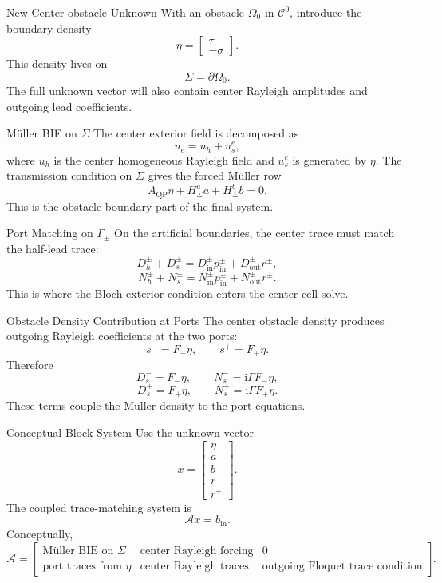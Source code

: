 \documentclass[aspectratio=169]{beamer}
\newcommand{\ii}{\mathrm{i}}
\newcommand{\Ccell}{\mathcal C}
\newcommand{\Atr}{\mathcal A}
\begin{document}
\begin{frame}{New Center-obstacle Unknown}
  With an obstacle \(\Omega_0\) in \(\Ccell^0\), introduce the boundary density
  \[
    \eta=
    \begin{bmatrix}
      \tau\\-\sigma
    \end{bmatrix}.
  \]
  This density lives on
  \[
    \Sigma=\partial\Omega_0.
  \]
  The full unknown vector will also contain center Rayleigh amplitudes and outgoing lead coefficients.
\end{frame}

\begin{frame}{M\"uller BIE on \(\Sigma\)}
  The center exterior field is decomposed as
  \[
    u_e=u_h+u_s^e,
  \]
  where \(u_h\) is the center homogeneous Rayleigh field and \(u_s^e\) is generated by \(\eta\).
  The transmission condition on \(\Sigma\) gives the forced M\"uller row
  \[
    A_{\mathrm{QP}}\eta
    +
    H_\Sigma^a a
    +
    H_\Sigma^b b
    =
    0.
  \]
  This is the obstacle-boundary part of the final system.
\end{frame}

\begin{frame}{Port Matching on \(\Gamma_\pm\)}
  On the artificial boundaries, the center trace must match the half-lead trace:
  \[
    D_h^\pm+D_s^\pm
    =
    D_{\mathrm{in}}^\pm p_{\mathrm{in}}^\pm
    +
    D_{\mathrm{out}}^\pm r^\pm,
  \]
  \[
    N_h^\pm+N_s^\pm
    =
    N_{\mathrm{in}}^\pm p_{\mathrm{in}}^\pm
    +
    N_{\mathrm{out}}^\pm r^\pm.
  \]
  This is where the Bloch exterior condition enters the center-cell solve.
\end{frame}

\begin{frame}{Obstacle Density Contribution at Ports}
  The center obstacle density produces outgoing Rayleigh coefficients at the two ports:
  \[
    s^- = F_-\eta,
    \qquad
    s^+ = F_+\eta.
  \]
  Therefore
  \[
    D_s^- = F_-\eta,
    \qquad
    N_s^- = \ii\Gamma F_-\eta,
  \]
  \[
    D_s^+ = F_+\eta,
    \qquad
    N_s^+ = \ii\Gamma F_+\eta.
  \]
  These terms couple the M\"uller density to the port equations.
\end{frame}

\begin{frame}{Conceptual Block System}
  Use the unknown vector
  \[
    x=
    \begin{bmatrix}
      \eta\\ a\\ b\\ r^-\\ r^+
    \end{bmatrix}.
  \]
  The coupled trace-matching system is
  \[
    \Atr x=b_{\mathrm{in}}.
  \]
  Conceptually,
  \[
    \Atr
    =
    \begin{bmatrix}
      \text{M\"uller BIE on }\Sigma
      &
      \text{center Rayleigh forcing}
      &
      0
      \\
      \text{port traces from }\eta
      &
      \text{center Rayleigh traces}
      &
      \text{outgoing Floquet trace condition}
    \end{bmatrix}.
  \]
\end{frame}
\end{document}
